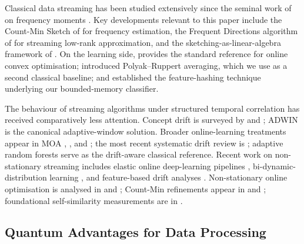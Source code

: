 \documentclass[preprint,12pt,authoryear]{elsarticle}
\begin{document}
Classical data streaming has been studied extensively since the seminal work of \citet{alon1999space} on frequency moments \citep{muthukrishnan2005data}. Key developments relevant to this paper include the Count-Min Sketch of \citet{cormode2005improved} for frequency estimation, the Frequent Directions algorithm of \citet{ghashami2016frequent} for streaming low-rank approximation, and the sketching-as-linear-algebra framework of \citet{woodruff2014sketching}. On the learning side, \citet{shalev2012online} provides the standard reference for online convex optimisation; \citet{polyak1992averaging} introduced Polyak--Ruppert averaging, which we use as a second classical baseline; and \citet{weinberger2009featurehashing} established the feature-hashing technique underlying our bounded-memory classifier.

The behaviour of streaming algorithms under structured temporal correlation has received comparatively less attention. Concept drift is surveyed by \citet{gama2014driftsurvey} and \citet{ditzler2015nonstationary}; ADWIN \citep{bifet2007adwin} is the canonical adaptive-window solution. Broader online-learning treatments appear in MOA \citep{bifet2010moa}, \citet{hoi2021online}, and \citet{gama2010knowledge}; the most recent systematic drift review is \citet{arora2024driftreview}; adaptive random forests \citep{gomes2017adaptiverf} serve as the drift-aware classical reference. Recent work on non-stationary streaming includes elastic online deep-learning pipelines \citep{su2024elasticonline}, bi-dynamic-distribution learning \citep{yan2024bidynamic}, and feature-based drift analyses \citep{hinder2024featuredrift}. Non-stationary online optimisation is analysed in \citet{besbes2015non} and \citet{ben2010agnostic}; Count-Min refinements appear in \citet{benmazziane2022countmin} and \citet{cormode2011synopses}; foundational self-similarity measurements are in \citet{park2000selfsimilar}.

\subsection{Quantum Advantages for Data Processing}
\end{document}
